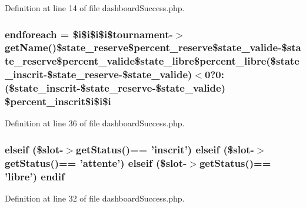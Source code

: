 Definition at line 14 of file dashboard\-Success.\-php.

\hypertarget{dashboard_success_8php_a672d9707ef91db026c210f98cc601123}{
\subsubsection[{endforeach}]{\setlength{\rightskip}{0pt plus 5cm}endforeach = \$i\$i\$i\$i\$tournament-\/$>$get\-Name()\$state\-\_\-reserve\$percent\-\_\-reserve\$state\-\_\-valide-\/\$state\-\_\-reserve\$percent\-\_\-valide\$state\-\_\-libre\$percent\-\_\-libre(\$state\-\_\-inscrit-\/\$state\-\_\-reserve-\/\$state\-\_\-valide)$<$0?0\-:(\$state\-\_\-inscrit-\/\$state\-\_\-reserve-\/\$state\-\_\-valide) \$percent\-\_\-inscrit\$i\$i\$i}}\label{dashboard_success_8php_a672d9707ef91db026c210f98cc601123}


Definition at line 36 of file dashboard\-Success.\-php.

\hypertarget{dashboard_success_8php_a8192ceebfb08d806fd4e3012f00f1715}{
\subsubsection[{endif}]{\setlength{\rightskip}{0pt plus 5cm}elseif (\$slot-\/$>$get\-Status()== 'inscrit') elseif (\$slot-\/$>$get\-Status()== 'attente') elseif (\$slot-\/$>$get\-Status()== 'libre') endif}}\label{dashboard_success_8php_a8192ceebfb08d806fd4e3012f00f1715}


Definition at line 32 of file dashboard\-Success.\-php.

